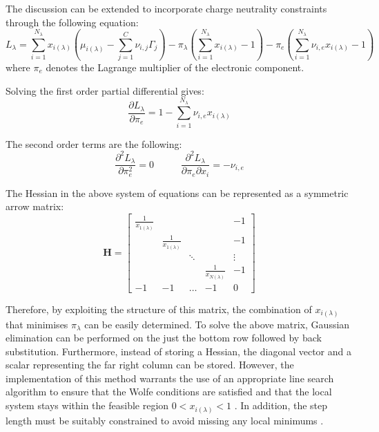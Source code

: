 	 The discussion can be extended to incorporate charge neutrality constraints through the following equation:
	 \begin{equation}
		L_\lambda = \sum_{i=1}^{N_\lambda} x_{i(\lambda)}\left( \mu_{i(\lambda)} - \sum_{j=1}^{C} \nu_{i,j}\Gamma_j \right) - \pi_{\lambda}\left( \sum_{i=1}^{N_\lambda} x_{i(\lambda)} -  1 \right) - \pi_e \left( \sum_{i=1}^{N_\lambda} \nu_{i,e} x_{i(\lambda)} -  1\right)
	\end{equation}
	where $\pi_e$ denotes the Lagrange multiplier of the electronic component.
	
	Solving the first order partial differential gives:
	\begin{equation}
	\frac{\partial L_\lambda}{\partial \pi_e} = 1 - \sum_{i=1}^{N_\lambda} \nu_{i,e} x_{i(\lambda)}
	\end{equation}
	
	The second order terms are the following:
	\begin{equation}
	\frac{\partial^2 L_\lambda}{\partial \pi_e^2} = 0 \mspace{50mu} \frac{\partial^2 L_\lambda}{\partial \pi_e \partial x_i} = -\nu_{i,e}
	\end{equation}

	 
	 The Hessian in the above system of equations can be represented as a symmetric arrow matrix:
	 \begin{equation}\label{eq:BB_mat}
        		\mathbf{H} = 
        		\begin{bmatrix}
            		\frac{1}{x_{1(\lambda)}} & {} & {} & {} & -1 \\
		 	{} & \frac{1}{x_{1(\lambda)}} & {} & {} & -1 \\
			{} & {} & {\ddots} & {} & \vdots \\
			{} & {} & {} & \frac{1}{x_{N(\lambda)}} & -1 \\
			{-1} & {-1} & {\dots} & {-1} & 0
        		\end{bmatrix}
   	\end{equation}

	Therefore, by exploiting the structure of this matrix, the combination of ${x_{i(\lambda)}}$ that minimises ${\pi_{\lambda}}$ can be easily determined. To solve the above matrix, Gaussian elimination can be performed on the just the bottom row followed by back substitution. Furthermore, instead of storing a Hessian, the diagonal vector and a scalar representing the far right column can be stored. However, the implementation of this method warrants the use of an appropriate line search algorithm to ensure that the Wolfe conditions are satisfied and that the local system stays within the feasible region $0 < x_{i(\lambda)}<1$ . In addition, the step length must be suitably constrained to avoid missing any local minimums \cite{Piro16}.
		
